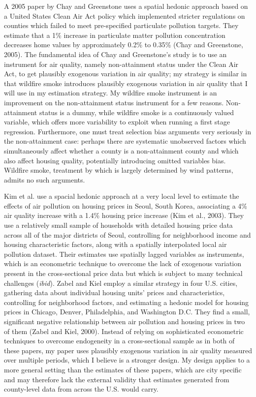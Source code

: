\documentclass[12pt]{article}
\begin{document}
A 2005 paper by Chay and Greenstone uses a spatial hedonic approach based on a United States Clean Air Act policy which implemented stricter regulations on counties which failed to meet pre-specified particulate pollution targets.  They estimate that a 1\% increase in particulate matter pollution concentration decreases home values by approximately 0.2\% to 0.35\% (Chay and Greenstone, 2005).  The fundamental idea of Chay and Greenstone's study is to use an instrument for air quality, namely non-attainment status under the Clean Air Act, to get plausibly exogenous variation in air quality; my strategy is similar in that wildfire smoke introduces plausibly exogenous variation in air quality that I will use in my estimation strategy.  My wildfire smoke instrument is an improvement on the non-attainment status instrument for a few reasons.   Non-attainment status is a dummy, while wildfire smoke is a continuously valued variable, which offers more variability to exploit when running a first stage regression.  Furthermore, one must treat selection bias arguments very seriously in the non-attainment case: perhaps there are systematic unobserved factors which simultaneously affect whether a county is a non-attainment county and which also affect housing quality, potentially introducing omitted variables bias.  Wildfire smoke, treatment by which is largely determined by wind patterns, admits no such arguments.


Kim et al. use a spacial hedonic approach at a very local level to estimate the effects of air pollution on housing prices in Seoul, South Korea, associating a 4\% air quality increase with a 1.4\% housing price increase (Kim et al., 2003).  They use a relatively small sample of households with detailed housing price data across all of the major districts of Seoul, controlling for neighborhood income and housing characteristic factors, along with a spatially interpolated local air pollution dataset.  Their estimates use spatially lagged variables as instruments, which is an econometric technique to overcome the lack of exogenous variation present in the cross-sectional price data but which is subject to many technical challenges (\textit{ibid}).  Zabel and Kiel employ a similar strategy in four U.S. cities, gathering data about individual housing units' prices and characteristics, controlling for neighborhood factors, and estimating a hedonic model for housing prices in Chicago, Denver, Philadelphia, and Washington D.C.  They find a small, significant negative relationship between air pollution and housing prices in two of them (Zabel and Kiel, 2000).  Instead of relying on sophisticated econometric techniques to overcome endogeneity in a cross-sectional sample as in both of these papers, my paper uses plausibly exogenous variation in air quality measured over multiple periods, which I believe is a stronger design.  My design applies to a more general setting than the estimates of these papers, which are city specific and may therefore lack the external validity that estimates generated from county-level data from across the U.S. would carry.   
\end{document}
